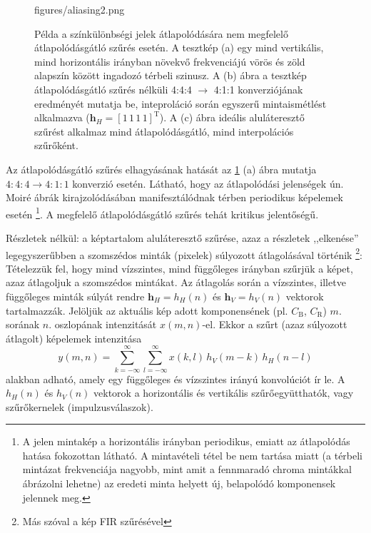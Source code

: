 \begin{figure}[h!]
	\centering
	\begin{overpic}[width = 0.75\columnwidth ]{figures/aliasing2.png}
 	\end{overpic}
	\caption{Példa a színkülönbségi jelek átlapolódására nem megfelelő átlapolódásgátló szűrés esetén.
 	A tesztkép (a) egy mind vertikális, mind horizontális irányban növekvő frekvenciájú vörös és zöld alapszín között ingadozó térbeli szinusz.
 	A (b) ábra a tesztkép átlapolódásgátló szűrés nélküli 4:4:4 $\rightarrow$ 4:1:1 konverziójának eredményét mutatja be, inteproláció során egyszerű mintaismétlést alkalmazva ($\mathbf{h}_H= \left[ 1\,1 \,1 \,1 \right]^{\mathrm{T}}$).
	A (c) ábra ideális aluláteresztő szűrést alkalmaz mind átlapolódásgátló, mind interpolációs szűrőként.}
	\label{Fig:chroma_subsampling}
\end{figure}
\vspace{3mm}
Az átlapolódásgátló szűrés elhagyásának hatását az \ref{Fig:chroma_subsampling} (a) ábra mutatja $4:4:4 \rightarrow 4:1:1$ konverzió esetén.
Látható, hogy az átlapolódási jelenségek ún. Moiré ábrák kirajzolódásában manifesztálódnak térben periodikus képelemek esetén \footnote{A jelen mintakép a horizontális irányban periodikus, emiatt az átlapolódás hatása fokozottan látható.
A mintavételi tétel be nem tartása miatt (a térbeli mintázat frekvenciája nagyobb, mint amit a fennmaradó chroma mintákkal ábrázolni lehetne) az eredeti minta helyett új, belapolódó komponensek jelennek meg.}.
A megfelelő átlapolódásgátló szűrés tehát kritikus jelentőségű.

Részletek nélkül: a képtartalom aluláteresztő szűrése, azaz a részletek ,,elkenése'' legegyszerűbben a szomszédos minták (pixelek) súlyozott átlagolásával történik \footnote{Más szóval a kép FIR szűrésével}: 
Tételezzük fel, hogy mind vízszintes, mind függőleges irányban szűrjük a képet, azaz átlagoljuk a szomszédos mintákat.
Az átlagolás során a vízszintes, illetve függőleges minták súlyát rendre $\mathbf{h}_H = h_H(n)$ és $\mathbf{h}_V = h_V(n)$ vektorok tartalmazzák.
Jelöljük az aktuális kép adott komponensének (pl. $C_{\mathrm{B}}$, $C_{\mathrm{R}}$) $m.$ sorának $n.$ oszlopának intenzitását $x(m,n)$-el.	
Ekkor a szűrt (azaz súlyozott átlagolt) képelemek intenzitása
\begin{equation}
y(m,n) = \sum_{k = -\infty}^{\infty} \sum_{l = -\infty}^{\infty} x(k,l)\, h_V(m-k) \, h_H(n-l)
\end{equation}
alakban adható, amely egy függőleges és vízszintes irányú konvolúciót ír le.
A $h_H(n)$ és $h_V(n)$ vektorok a horizontális és vertikális szűrőegyütthatók, vagy szűrőkernelek (impulzusválaszok).

